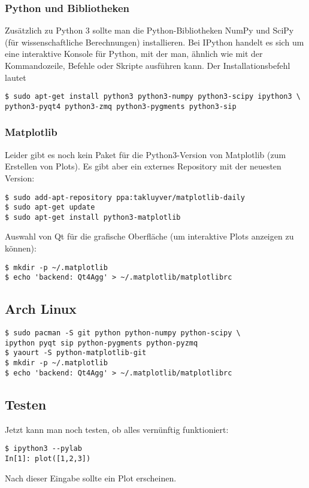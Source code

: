 \subsubsection{Python und Bibliotheken}
Zusätzlich zu Python 3 sollte man die Python-Bibliotheken NumPy und SciPy (für wissenschaftliche Berechnungen) installieren.
Bei IPython handelt es sich um eine interaktive Konsole für Python, mit der man, ähnlich wie mit der Kommandozeile, Befehle oder Skripte ausführen kann.
Der Installationsbefehl lautet
\begin{verbatim}
$ sudo apt-get install python3 python3-numpy python3-scipy ipython3 \
python3-pyqt4 python3-zmq python3-pygments python3-sip
\end{verbatim}

\subsubsection{Matplotlib}
Leider gibt es noch kein Paket für die Python3-Version von Matplotlib (zum Erstellen von Plots).
Es gibt aber ein externes Repository mit der neuesten Version:
\begin{verbatim}
$ sudo add-apt-repository ppa:takluyver/matplotlib-daily
$ sudo apt-get update
$ sudo apt-get install python3-matplotlib
\end{verbatim}
Auswahl von Qt für die grafische Oberfläche (um interaktive Plots anzeigen zu können):
\begin{verbatim}
$ mkdir -p ~/.matplotlib
$ echo 'backend: Qt4Agg' > ~/.matplotlib/matplotlibrc
\end{verbatim}

\subsection{Arch Linux}
\begin{verbatim}
$ sudo pacman -S git python python-numpy python-scipy \
ipython pyqt sip python-pygments python-pyzmq
$ yaourt -S python-matplotlib-git
$ mkdir -p ~/.matplotlib
$ echo 'backend: Qt4Agg' > ~/.matplotlib/matplotlibrc
\end{verbatim}

\subsection{Testen}
Jetzt kann man noch testen, ob alles vernünftig funktioniert:
\begin{verbatim}
$ ipython3 --pylab
In[1]: plot([1,2,3])
\end{verbatim}
Nach dieser Eingabe sollte ein Plot erscheinen.
